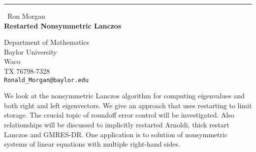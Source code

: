 \documentclass{report}
\begin{document}
\begin{center}
\rule{6in}{1pt} \
{\large Ron Morgan \\
{\bf Restarted Nonsymmetric Lanczos}}

Department of Mathematics \\ Baylor University \\ Waco \\ TX 76798-7328
\\
{\tt Ronald\_Morgan@baylor.edu}\end{center}

We look at the nonsymmetric Lanczos algorithm for computing eigenvalues
and both right and left eigenvectors. We give an approach that uses
restarting to limit storage. The crucial topic of roundoff error control
will be investigated. Also relationships will be discussed to implicitly
restarted Arnoldi, thick restart Lanczos and GMRES-DR. One application is
to solution of nonsymmetric systems of linear equations with multiple
right-hand sides.
\end{document}
